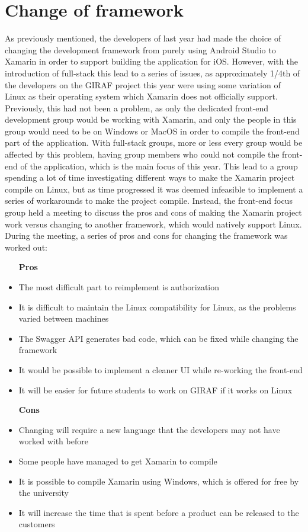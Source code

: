 \section{Change of framework}
As previously mentioned, the developers of last year had made the choice of changing the development framework from purely using Android Studio to Xamarin in order to support building the application for iOS.
However, with the introduction of full-stack this lead to a series of issues, as approximately 1/4th of the developers on the GIRAF project this year were using some variation of Linux as their operating system which Xamarin does not officially support.
Previously, this had not been a problem, as only the dedicated front-end development group would be working with Xamarin, and only the people in this group would need to be on Windows or MacOS in order to compile the front-end part of the application.
With full-stack groups, more or less every group would be affected by this problem, having group members who could not compile the front-end of the application, which is the main focus of this year.
This lead to a group spending a lot of time investigating different ways to make the Xamarin project compile on Linux, but as time progressed it was deemed infeasible to implement a series of workarounds to make the project compile.
Instead, the front-end focus group held a meeting to discuss the pros and cons of making the Xamarin project work versus changing to another framework, which would natively support Linux.
During the meeting, a series of pros and cons for changing the framework was worked out:

\begin{itemize}
    \item [\textbf{Pros}]
    \item The most difficult part to reimplement is authorization
    \item It is difficult to maintain the Linux compatibility for Linux, as the problems varied between machines
    \item The Swagger API generates bad code, which can be fixed while changing the framework
    \item It would be possible to implement a cleaner UI while re-working the front-end 
    \item It will be easier for future students to work on GIRAF if it works on Linux
    \item [\textbf{Cons}]
    \item Changing will require a new language that the developers may not have worked with before
    \item Some people have managed to get Xamarin to compile
    \item It is possible to compile Xamarin using Windows, which is offered for free by the university
    \item It will increase the time that is spent before a product can be released to the customers
\end{itemize}

